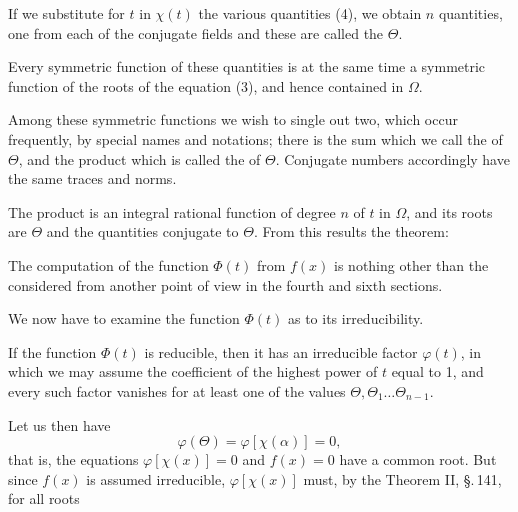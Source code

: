 
If we substitute for $t$ in $\chi(t)$ the various quantities (4), we
obtain $n$ quantities, one from each of the conjugate fields
and these are called the  $\Theta$.

Every symmetric function of these quantities is at the same time a
symmetric function of the roots of the equation (3), and hence
contained in $\Omega$.

Among these symmetric functions we wish to single out two, which
occur frequently, by special names and notations; there is the sum
which we call the  of $\Theta$, and the product
which is called the  of $\Theta$. Conjugate numbers accordingly
have the same traces and norms.

The product
is an integral rational function of degree $n$ of $t$ in
$\Omega$, and its roots are $\Theta$ and the quantities conjugate to
$\Theta$. From this results the theorem:


The computation of the function $\Phi(t)$ from $f(x)$ is nothing
other than the  considered
from another point of view in the fourth and sixth sections.

We now have to examine the function $\Phi(t)$ as to its
irreducibility.

If the function $\Phi(t)$ is reducible, then it has an
irreducible factor $\varphi(t)$, in which we may assume the coefficient of the
highest power of $t$ equal to 1, and every such
factor vanishes for at least one of the values $\Theta,
\Theta_1 \ldots \Theta_{n-1}$.

Let us then have
\[
\varphi(\Theta) = \varphi[\chi(\alpha)] = 0,
\]
that is, the equations $\varphi[\chi(x)] = 0$ and $f(x) = 0$ have
a common root. But since $f(x)$ is assumed irreducible,
$\varphi[\chi(x)]$ must, by the Theorem II, \S.\,141, for all roots
